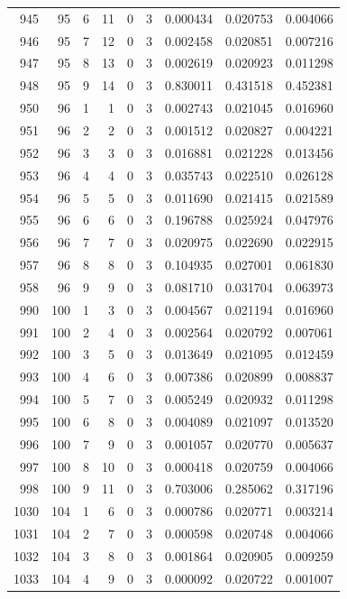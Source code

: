 \begin{longtable}{rrrrrrrrr}
945 & 95 & 6 & 11 & 0 & 3 & 0.000434 & 0.020753 & 0.004066 \\
946 & 95 & 7 & 12 & 0 & 3 & 0.002458 & 0.020851 & 0.007216 \\
947 & 95 & 8 & 13 & 0 & 3 & 0.002619 & 0.020923 & 0.011298 \\
948 & 95 & 9 & 14 & 0 & 3 & 0.830011 & 0.431518 & 0.452381 \\
950 & 96 & 1 & 1 & 0 & 3 & 0.002743 & 0.021045 & 0.016960 \\
951 & 96 & 2 & 2 & 0 & 3 & 0.001512 & 0.020827 & 0.004221 \\
952 & 96 & 3 & 3 & 0 & 3 & 0.016881 & 0.021228 & 0.013456 \\
953 & 96 & 4 & 4 & 0 & 3 & 0.035743 & 0.022510 & 0.026128 \\
954 & 96 & 5 & 5 & 0 & 3 & 0.011690 & 0.021415 & 0.021589 \\
955 & 96 & 6 & 6 & 0 & 3 & 0.196788 & 0.025924 & 0.047976 \\
956 & 96 & 7 & 7 & 0 & 3 & 0.020975 & 0.022690 & 0.022915 \\
957 & 96 & 8 & 8 & 0 & 3 & 0.104935 & 0.027001 & 0.061830 \\
958 & 96 & 9 & 9 & 0 & 3 & 0.081710 & 0.031704 & 0.063973 \\
990 & 100 & 1 & 3 & 0 & 3 & 0.004567 & 0.021194 & 0.016960 \\
991 & 100 & 2 & 4 & 0 & 3 & 0.002564 & 0.020792 & 0.007061 \\
992 & 100 & 3 & 5 & 0 & 3 & 0.013649 & 0.021095 & 0.012459 \\
993 & 100 & 4 & 6 & 0 & 3 & 0.007386 & 0.020899 & 0.008837 \\
994 & 100 & 5 & 7 & 0 & 3 & 0.005249 & 0.020932 & 0.011298 \\
995 & 100 & 6 & 8 & 0 & 3 & 0.004089 & 0.021097 & 0.013520 \\
996 & 100 & 7 & 9 & 0 & 3 & 0.001057 & 0.020770 & 0.005637 \\
997 & 100 & 8 & 10 & 0 & 3 & 0.000418 & 0.020759 & 0.004066 \\
998 & 100 & 9 & 11 & 0 & 3 & 0.703006 & 0.285062 & 0.317196 \\
1030 & 104 & 1 & 6 & 0 & 3 & 0.000786 & 0.020771 & 0.003214 \\
1031 & 104 & 2 & 7 & 0 & 3 & 0.000598 & 0.020748 & 0.004066 \\
1032 & 104 & 3 & 8 & 0 & 3 & 0.001864 & 0.020905 & 0.009259 \\
1033 & 104 & 4 & 9 & 0 & 3 & 0.000092 & 0.020722 & 0.001007 \\

\end{longtable}
